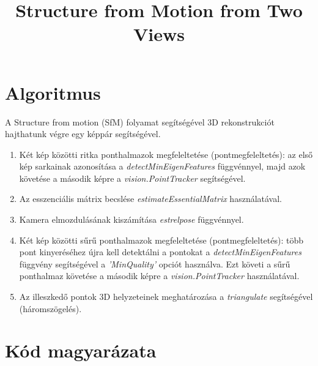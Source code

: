 \documentclass[12pt]{report}
\title{Structure from Motion from Two Views}
\date{}
\begin{document}
    \maketitle

    \chapter{Algoritmus}
    A Structure from motion (SfM) folyamat segítségével 3D rekonstrukciót hajthatunk végre egy képpár segítségével.

    \begin{enumerate}
        \item Két kép közötti ritka ponthalmazok megfeleltetése (pontmegfeleltetés): az első kép sarkainak azonosítása a \textit{detectMinEigenFeatures} függvénnyel, majd azok követése a második képre a \textit{vision.PointTracker} segítségével.
        \item Az esszenciális mátrix becslése \textit{estimateEssentialMatrix} használatával.
        \item Kamera elmozdulásának kiszámítása \textit{estrelpose} függvénnyel.
        \item Két kép közötti sűrű ponthalmazok megfeleltetése (pontmegfeleltetés): több pont kinyeréséhez újra kell detektálni a pontokat a \textit{detectMinEigenFeatures} függvény segítségével a \textit{'MinQuality'} opciót használva. Ezt követi a sűrű ponthalmaz követése a második képre a \textit{vision.PointTracker} használatával.
        \item Az illeszkedő pontok 3D helyzeteinek meghatározása a \textit{triangulate} segítségével (háromszögelés).
    \end{enumerate}    

    \chapter{Kód magyarázata}
\end{document}

